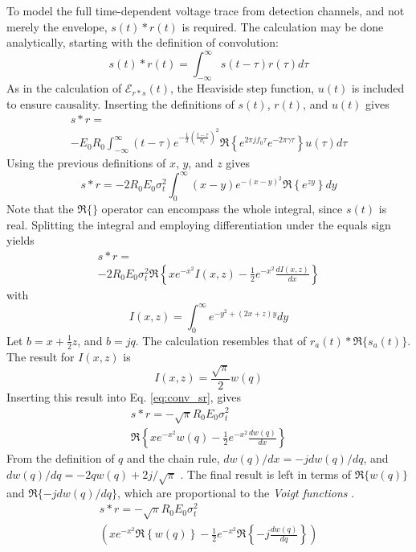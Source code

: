 \documentclass[amsmath,amssymb,aps,prd,10pt,twocolumn,showkeys]{revtex4}
\begin{document}
To model the full time-dependent voltage trace from detection channels, and not merely the envelope, $s(t) * r(t)$ is required.  The calculation may be done analytically, starting with the definition of convolution:
\begin{equation}
s(t) * r(t) = \int_{-\infty}^{\infty} s(t-\tau) r(\tau) d\tau 
\end{equation}
As in the calculation of $\mathcal{E}_{r*s}(t)$, the Heaviside step function, $u(t)$ is included to ensure causality.  Inserting the definitions of $s(t)$, $r(t)$, and $u(t)$ gives
\begin{multline}
s * r = \\ -E_0 R_0 \int_{-\infty}^{\infty} (t-\tau) e^{-\frac{1}{2}\left(\frac{t-\tau}{\sigma_t}\right)^2} \Re\left\lbrace e^{2\pi j f_0 \tau} e^{-2\pi\gamma \tau} \right\rbrace u(\tau) d\tau
\end{multline}
Using the previous definitions of $x$, $y$, and $z$ gives
\begin{equation}
s * r = -2R_0 E_0 \sigma_t^2 \int_{0}^{\infty} (x-y) e^{-(x-y)^2} \Re\left\lbrace e^{zy} \right\rbrace dy
\end{equation}
Note that the $\Re\lbrace \rbrace$ operator can encompass the whole integral, since $s(t)$ is real.  Splitting the integral and employing differentiation under the equals sign yields
\begin{multline}
s * r = \\ -2R_0 E_0 \sigma_t^2 \Re\left\lbrace xe^{-x^2}I(x,z) - \frac{1}{2}e^{-x^2} \frac{dI(x,z)}{dx} \right\rbrace \label{eq:conv_sr}
\end{multline}
with
\begin{equation}
I(x,z) = \int_0^{\infty} e^{-y^2 + (2x + z)y}dy
\end{equation}
Let $b=x+\frac{1}{2}z$, and $b = j q$.  The calculation resembles that of $r_a(t) * \Re\lbrace s_a(t)\rbrace$.  The result for $I(x,z)$ is
\begin{equation}
I(x,z) = \frac{\sqrt{\pi}}{2} w(q)
\end{equation}
Inserting this result into Eq. \ref{eq:conv_sr}, gives
\begin{multline}
s * r = -\sqrt{\pi}R_0 E_0 \sigma_t^2 \\ \Re\left\lbrace xe^{-x^2} w(q) - \frac{1}{2}e^{-x^2} \frac{d w(q)}{dx} \right\rbrace
\end{multline}
From the definition of $q$ and the chain rule, $dw(q)/dx = -jdw(q)/dq$, and $dw(q)/dq = -2qw(q)+2j/\sqrt{\pi}$ \cite{NIST:DLMF}.  The final result is left in terms of $\Re\lbrace w(q)\rbrace$ and $\Re\lbrace -jdw(q)/dq\rbrace$, which are proportional to the \textit{Voigt functions} \cite{NIST:DLMF,PhysRevD.105.123019}.
\begin{multline}
s * r = -\sqrt{\pi}R_0 E_0 \sigma_t^2 \\ \left(xe^{-x^2} \Re\left\lbrace w(q) \right\rbrace - \frac{1}{2}e^{-x^2} \Re\left\lbrace -j \frac{d w(q)}{dq} \right\rbrace \right) \label{eq:final3}
\end{multline}
\end{document}
